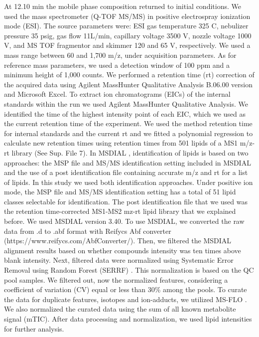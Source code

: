 \documentclass[9pt,twocolumn,twoside,lineno]{biorxiv}
\begin{document}
At 12.10 min the mobile phase composition returned to initial conditions.
We used the mass spectrometer (Q-TOF MS/MS) in positive electrospray ionization mode (ESI).
The source parameters were: ESI gas temperature 325 \degree C, nebulizer pressure 35 psig, gas flow 11L/min, capillary voltage 3500 V, nozzle voltage 1000 V, and MS TOF fragmentor and skimmer 120 and 65 V, respectively.
We used a mass range between 60 and 1,700 m/z, under acquisition parameters. 
As for reference mass parameters, we used a detection window of 100 ppm and a minimum height of 1,000 counts. 
We performed a retention time (rt) correction of the acquired data using Agilent MassHunter Qualitative Analysis B.06.00 version and Microsoft Excel. 
To extract ion chromatograms (EICs) of the internal standards within the run we used Agilent MassHunter Qualitative Analysis.
We identified the time of the highest intensity point of each EIC, which we used as the current retention time of the experiment. 
We used the method retention time for internal standards and the current rt and we fitted a polynomial regression to calculate new retention times using retention times from 501 lipids of a MS1 m/z-rt library (See Sup. File 7). 
In MSDIAL \cite{Tsugawa2015-kh}, identification of lipids is based on two approaches: the MSP file and MS/MS identification setting included in MSDIAL and the use of a post identification file containing accurate m/z and rt for a list of lipids. 
In this study we used both identification approaches. 
Under positive ion mode, the MSP file and MS/MS identification setting has a total of 51 lipid classes  selectable for identification. 
The post identification file that we used was the retention time-corrected MS1-MS2 mz-rt lipid library that we explained before. 
We used MSDIAL \cite{Tsugawa2015-kh} version 3.40. 
To use MSDIAL, we converted the raw data from .d to .abf format with Reifycs Abf converter (https://www.reifycs.com/AbfConverter/). 
Then, we filtered the MSDIAL alignment results based on whether compounds intensity was ten times above blank intensity. Next, filtered data were normalized using Systematic Error Removal using Random Forest (SERRF) \cite{Fan2019}. This normalization is based on the QC pool samples. 
We filtered out, now the normalized features, considering a coefficient of variation (CV) equal or less than 30\% among the pools. 
To curate the data for duplicate features, isotopes and ion-adducts, we utilized MS-FLO \cite{DeFelice2017-ms}.
We also normalized the curated data using the sum of all known metabolite signal (mTIC). 
After data processing and normalization, we used lipid intensities for further analysis.
\end{document}
